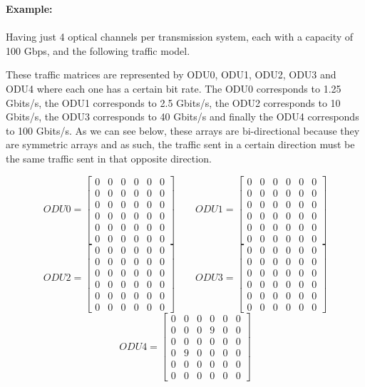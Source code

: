 \clearpage
\textbf{Example:}  \\
\\
Having just 4 optical channels per transmission system, each with a capacity of 100 Gbps, and the following traffic model.

These traffic matrices are represented by ODU0, ODU1, ODU2, ODU3 and ODU4 where each one has a certain bit rate.
The ODU0 corresponds to 1.25 Gbits/s, the ODU1 corresponds to 2.5 Gbits/s, the ODU2 corresponds to 10 Gbits/s, the ODU3 corresponds to 40 Gbits/s and finally the ODU4 corresponds to 100 Gbits/s.
As we can see below, these arrays are bi-directional because they are symmetric arrays and as such, the traffic sent in a certain direction must be the same traffic sent in that opposite direction.

\[
ODU0=
\begin{bmatrix}
0 & 0 & 0 & 0 & 0 & 0 \\
0 & 0 & 0 & 0 & 0 & 0 \\
0 & 0 & 0 & 0 & 0 & 0 \\
0 & 0 & 0 & 0 & 0 & 0 \\
0 & 0 & 0 & 0 & 0 & 0 \\
0 & 0 & 0 & 0 & 0 & 0
\end{bmatrix}
\qquad ODU1=
\begin{bmatrix}
0 & 0 & 0 & 0 & 0 & 0 \\
0 & 0 & 0 & 0 & 0 & 0 \\
0 & 0 & 0 & 0 & 0 & 0 \\
0 & 0 & 0 & 0 & 0 & 0 \\
0 & 0 & 0 & 0 & 0 & 0 \\
0 & 0 & 0 & 0 & 0 & 0
\end{bmatrix}
\]
\[
ODU2=
\begin{bmatrix}
0 & 0 & 0 & 0 & 0 & 0 \\
0 & 0 & 0 & 0 & 0 & 0 \\
0 & 0 & 0 & 0 & 0 & 0 \\
0 & 0 & 0 & 0 & 0 & 0 \\
0 & 0 & 0 & 0 & 0 & 0 \\
0 & 0 & 0 & 0 & 0 & 0
\end{bmatrix}
\qquad ODU3=
\begin{bmatrix}
0 & 0 & 0 & 0 & 0 & 0 \\
0 & 0 & 0 & 0 & 0 & 0 \\
0 & 0 & 0 & 0 & 0 & 0 \\
0 & 0 & 0 & 0 & 0 & 0 \\
0 & 0 & 0 & 0 & 0 & 0 \\
0 & 0 & 0 & 0 & 0 & 0
\end{bmatrix}
\]
\[
ODU4=
\begin{bmatrix}
0 & 0 & 0 & 0 & 0 & 0 \\
0 & 0 & 0 & 9 & 0 & 0 \\
0 & 0 & 0 & 0 & 0 & 0 \\
0 & 9 & 0 & 0 & 0 & 0 \\
0 & 0 & 0 & 0 & 0 & 0 \\
0 & 0 & 0 & 0 & 0 & 0
\end{bmatrix}
\]

